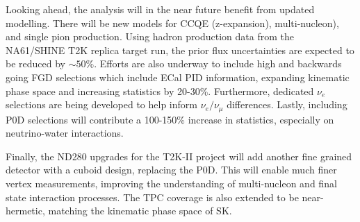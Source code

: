 Looking ahead, the analysis will in the near future benefit from updated modelling. There will be new models for CCQE (z-expansion\cite{z-exp}), multi-nucleon\cite{nieves1}), and single pion production\cite{thesis_minoo}. Using hadron production data from the NA61/SHINE T2K replica target run, the prior flux uncertainties are expected to be reduced by $\sim50\%$\cite{flux_red}. Efforts are also underway to include high and backwards going FGD selections which include ECal PID information, expanding kinematic phase space and increasing statistics by 20-30\%. Furthermore, dedicated $\nu_e$ selections are being developed to help inform $\nu_e/\nu_\mu$ differences. Lastly, including P0D selections will contribute a 100-150\% increase in statistics, especially on neutrino-water interactions.

Finally, the ND280 upgrades\cite{t2k_upgrades} for the T2K-II project\cite{t2k_ii} will add another fine grained detector with a cuboid design, replacing the P0D. This will enable much finer vertex measurements, improving the understanding of multi-nucleon and final state interaction processes. The TPC coverage is also extended to be near-hermetic, matching the kinematic phase space of SK.